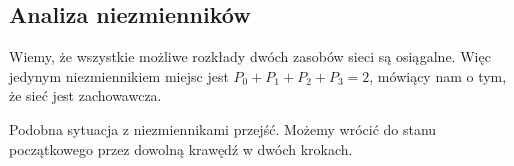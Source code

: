 \subsection{Analiza niezmienników}
\quad Wiemy, że wszystkie możliwe rozkłady dwóch zasobów sieci są osiągalne. 
Więc jedynym niezmiennikiem miejsc jest $P_0 + P_1 + P_2 + P_3 = 2$, mówiący nam o tym, że 
sieć jest zachowawcza.

Podobna sytuacja z niezmiennikami przejść. Możemy wrócić do stanu początkowego przez 
dowolną krawędź w dwóch krokach.